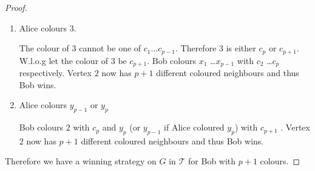 \begin{proof}
\begin{enumerate}
        \item Alice colours $3$.
        
        The colour of $3$ cannot be one of $c_1 \ldots c_{p-1}$. Therefore $3$ is either $c_p$ or $c_{p+1}$. 
        W.l.o.g let the colour of $3$ be $c_{p+1}$.
        Bob colours $x_1$ \ldots $x_{p-1}$ with $c_2$ \ldots $c_{p}$ respectively.
        Vertex $2$ now has $p+1$ different coloured neighbours and thus Bob wins. 
        
        \item Alice colours $y_{p-1}$ or $y_{p}$
        
        Bob colours $2$ with $c_p$ and $y_{p}$ (or $y_{p-1}$ if Alice coloured $y_p$) with $c_{p+1}$ .
        Vertex $2$ now has $p+1$ different coloured neighbours and thus Bob wins. 
    \end{enumerate}

    Therefore we have a winning strategy on $G$ in $\mathcal{T}$ for Bob with $p+1$ colours. 

\end{proof}

%
%    
%    
%       
%       
%    
%    
%
%
%       
%    
%    

